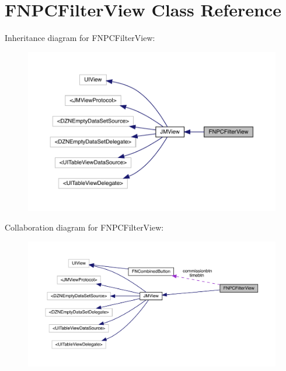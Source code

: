 \hypertarget{interface_f_n_p_c_filter_view}{}\section{F\+N\+P\+C\+Filter\+View Class Reference}
\label{interface_f_n_p_c_filter_view}


Inheritance diagram for F\+N\+P\+C\+Filter\+View\+:\nopagebreak
\begin{figure}[H]
\begin{center}
\leavevmode
\includegraphics[width=350pt]{interface_f_n_p_c_filter_view__inherit__graph}
\end{center}
\end{figure}


Collaboration diagram for F\+N\+P\+C\+Filter\+View\+:\nopagebreak
\begin{figure}[H]
\begin{center}
\leavevmode
\includegraphics[width=350pt]{interface_f_n_p_c_filter_view__coll__graph}
\end{center}
\end{figure}
